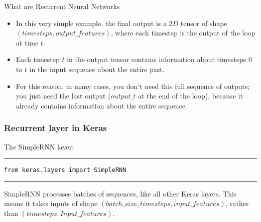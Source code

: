 \documentclass[11pt]{beamer}
\begin{document}
\begin{frame}{What are Recurrent Neural Networks}
	\begin{itemize}
		\item In this very simple example, the final output is a $2D$ tensor of shape $(timesteps, output\_features)$, where each timestep is the output of the loop at time $t$.
		\item Each timestep $t$ in the output tensor contains information about timesteps $0$ to $t$ in the input sequence about the entire past. 
		\item For this reason, in many cases, you don`t need this full sequence of outputs; you just need the last output ($output\_t$ at the end of the loop), because it already contains information about the entire sequence.
	\end{itemize}
\end{frame}
\begin{frame}[fragile]
\frametitle{Recurrent layer in Keras}
The SimpleRNN layer:
\newline
\newline
\rule{\textwidth}{1pt}
\begin{verbatim}
from keras.layers import SimpleRNN
\end{verbatim}
\rule{\textwidth}{1pt}
\newline
\newline
SimpleRNN processes batches of sequences, like all other
Keras layers. This means it takes inputs
of shape $(batch\_size, timesteps, input\_features)$, rather than $(timesteps,
Input\_features)$.
\end{frame}
%
\end{document}
